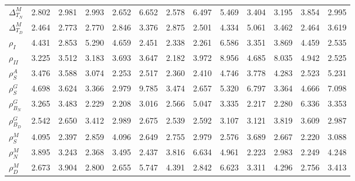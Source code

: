 \begin{center}
\begin{longtable}{lcccccccccccc}
$ {\Delta^{M}_{T_N}}   $	 & 	       2.802	 & 	       2.981	 & 	       2.993	 & 	       2.652	 & 	       6.652	 & 	       2.578	 & 	       6.497	 & 	       5.469	 & 	       3.404	 & 	       3.195	 & 	       3.854	 & 	       2.995 \\ 
$ {\Delta^{M}_{T_D}}   $	 & 	       2.464	 & 	       2.773	 & 	       2.770	 & 	       2.846	 & 	       3.376	 & 	       2.875	 & 	       2.501	 & 	       4.334	 & 	       5.061	 & 	       3.462	 & 	       2.464	 & 	       3.619 \\ 
$ {\rho_{I}}           $	 & 	       4.431	 & 	       2.853	 & 	       5.290	 & 	       4.659	 & 	       2.451	 & 	       2.338	 & 	       2.261	 & 	       6.586	 & 	       3.351	 & 	       3.869	 & 	       4.459	 & 	       2.535 \\ 
$ {\rho_{II}}          $	 & 	       3.225	 & 	       3.512	 & 	       3.183	 & 	       3.693	 & 	       3.647	 & 	       2.182	 & 	       3.972	 & 	       8.956	 & 	       4.685	 & 	       8.035	 & 	       4.942	 & 	       2.525 \\ 
$ {\rho^{A}_{S}}       $	 & 	       3.476	 & 	       3.588	 & 	       3.074	 & 	       2.253	 & 	       2.517	 & 	       2.360	 & 	       2.410	 & 	       4.746	 & 	       3.778	 & 	       4.283	 & 	       2.523	 & 	       5.231 \\ 
$ {\rho^{G}_{S}}       $	 & 	       4.698	 & 	       3.624	 & 	       3.366	 & 	       2.979	 & 	       9.785	 & 	       3.474	 & 	       2.657	 & 	       5.320	 & 	       6.797	 & 	       3.364	 & 	       4.666	 & 	       7.098 \\ 
$ {\rho^{G}_{B_N}}     $	 & 	       3.265	 & 	       3.483	 & 	       2.229	 & 	       2.208	 & 	       3.016	 & 	       2.566	 & 	       5.047	 & 	       3.335	 & 	       2.217	 & 	       2.280	 & 	       6.336	 & 	       3.353 \\ 
$ {\rho^{G}_{B_D}}     $	 & 	       2.542	 & 	       2.650	 & 	       3.412	 & 	       2.989	 & 	       2.675	 & 	       2.539	 & 	       2.592	 & 	       3.107	 & 	       3.121	 & 	       3.819	 & 	       3.609	 & 	       2.987 \\ 
$ {\rho^{M}_{S}}       $	 & 	       4.095	 & 	       2.397	 & 	       2.859	 & 	       4.096	 & 	       2.649	 & 	       2.755	 & 	       2.979	 & 	       2.576	 & 	       3.689	 & 	       2.667	 & 	       2.220	 & 	       3.088 \\ 
$ {\rho^{M}_{N}}       $	 & 	       3.895	 & 	       3.243	 & 	       2.368	 & 	       3.495	 & 	       2.437	 & 	       3.816	 & 	       6.634	 & 	       4.961	 & 	       2.223	 & 	       2.983	 & 	       2.249	 & 	       4.248 \\ 
$ {\rho^{M}_{D}}       $	 & 	       2.673	 & 	       3.904	 & 	       2.800	 & 	       2.655	 & 	       5.747	 & 	       4.391	 & 	       2.842	 & 	       6.623	 & 	       3.311	 & 	       4.296	 & 	       2.756	 & 	       3.413 \\ 
\end{longtable}
 \end{center}
